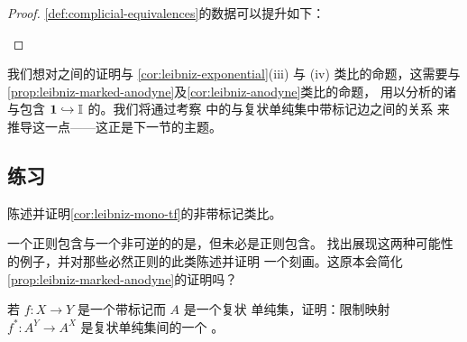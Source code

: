 \begin{proof}
\cref{def:complicial-equivalences}的数据可以提升如下：
\begin{center}
\qquad
{}
\end{center}
\end{proof}

我们想对\trQuasiCategory{}之间的\trIsofibration{}证明与
\cref{cor:leibniz-exponential}(iii) 与 (iv) 类比的命题，这需要与
\cref{prop:leibniz-marked-anodyne}及\cref{cor:leibniz-anodyne}类比的命题，
用以分析\trSimplicialSet{}的诸\trMonomorphism{}与包含
$\mathbf{1}\hookrightarrow\mathbb{I}$ 的\trLeibnizProduct。我们将通过考察%
\trQuasiCategory{}中的\trIsomorphism{}与复状单纯集中带标记边之间的关系
来推导这一点——这正是下一节的主题。

\subsection*{练习}

\begin{exercise}\label{ex:unmarked-leibniz-corollary}
陈述并证明\cref{cor:leibniz-mono-tf}的非带标记类比。
\end{exercise}

\begin{exercise}\label{ex:regular-entire-leibniz-products}
一个正则包含与一个非可逆的\trEntireInclusion{}的\trLeibnizProduct{}是\trEntireInclusion，但未必是正则包含。
找出展现这两种可能性的例子，并对那些必然正则的此类\trLeibnizProduct{}陈述并证明
一个刻画。这原本会简化\cref{prop:leibniz-marked-anodyne}的证明吗？
\end{exercise}

\begin{exercise}\label{ex:restriction-map-equivalence}
若 $f\colon X\to Y$ 是一个带标记\trHomotopyEquivalence{}而 $A$ 是一个复状
单纯集，证明：限制映射 $f^{*}\colon A^{Y}\to A^{X}$ 是复状单纯集间的一个%
\trEquivalence。
\end{exercise}

